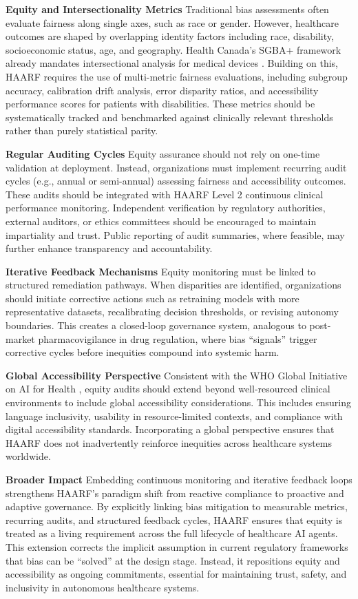 \documentclass[11pt]{article}
\begin{document}
\textbf{Equity and Intersectionality Metrics}  
Traditional bias assessments often evaluate fairness along single axes, such as race or gender. However, healthcare outcomes are shaped by overlapping identity factors including race, disability, socioeconomic status, age, and geography. Health Canada’s SGBA+ framework already mandates intersectional analysis for medical devices \cite{healthcanada2021sgba}. Building on this, HAARF requires the use of multi-metric fairness evaluations, including subgroup accuracy, calibration drift analysis, error disparity ratios, and accessibility performance scores for patients with disabilities. These metrics should be systematically tracked and benchmarked against clinically relevant thresholds rather than purely statistical parity.

\textbf{Regular Auditing Cycles}  
Equity assurance should not rely on one-time validation at deployment. Instead, organizations must implement recurring audit cycles (e.g., annual or semi-annual) assessing fairness and accessibility outcomes. These audits should be integrated with HAARF Level 2 continuous clinical performance monitoring. Independent verification by regulatory authorities, external auditors, or ethics committees should be encouraged to maintain impartiality and trust. Public reporting of audit summaries, where feasible, may further enhance transparency and accountability.

\textbf{Iterative Feedback Mechanisms}  
Equity monitoring must be linked to structured remediation pathways. When disparities are identified, organizations should initiate corrective actions such as retraining models with more representative datasets, recalibrating decision thresholds, or revising autonomy boundaries. This creates a closed-loop governance system, analogous to post-market pharmacovigilance in drug regulation, where bias “signals” trigger corrective cycles before inequities compound into systemic harm.

\textbf{Global Accessibility Perspective}  
Consistent with the WHO Global Initiative on AI for Health \cite{who2021aiethics}, equity audits should extend beyond well-resourced clinical environments to include global accessibility considerations. This includes ensuring language inclusivity, usability in resource-limited contexts, and compliance with digital accessibility standards. Incorporating a global perspective ensures that HAARF does not inadvertently reinforce inequities across healthcare systems worldwide.

\textbf{Broader Impact}  
Embedding continuous monitoring and iterative feedback loops strengthens HAARF’s paradigm shift from reactive compliance to proactive and adaptive governance. By explicitly linking bias mitigation to measurable metrics, recurring audits, and structured feedback cycles, HAARF ensures that equity is treated as a living requirement across the full lifecycle of healthcare AI agents. This extension corrects the implicit assumption in current regulatory frameworks that bias can be “solved” at the design stage. Instead, it repositions equity and accessibility as ongoing commitments, essential for maintaining trust, safety, and inclusivity in autonomous healthcare systems.
\end{document}
